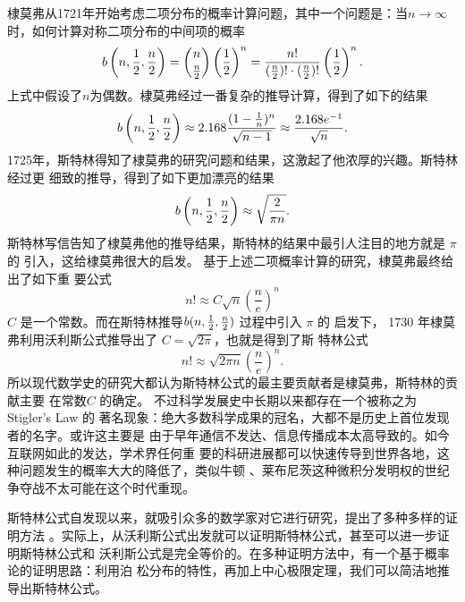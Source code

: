 棣莫弗从1721年开始考虑二项分布的概率计算问题，其中一个问题是：当$n \rightarrow
\infty $时，如何计算对称二项分布的中间项的概率
$$ b\left(n, {1\over2}, {n \over 2}\right) = \binom{n}{{n \over 2}} 
\left(\frac{1}{2}\right)^n 
= \frac{n!}{({n\over 2})! \cdot ({n \over 2})!} \left(\frac{1}{2}\right)^n .$$
上式中假设了$n$为偶数。棣莫弗经过一番复杂的推导计算，得到了如下的结果
$$ b\left(n, {1\over2}, {n\over2}\right) \approx  2.168 \frac{(1 - {1\over n})^n} {\sqrt{n-1}} 
\approx \frac{2.168 e^{-1}}{\sqrt{n}}.$$
1725年，斯特林得知了棣莫弗的研究问题和结果，这激起了他浓厚的兴趣。斯特林经过更
细致的推导，得到了如下更加漂亮的结果
$$ b\left(n, {1\over2}, {n\over2}\right) \approx \sqrt{\frac{2}{\pi n}} .$$
斯特林写信告知了棣莫弗他的推导结果，斯特林的结果中最引人注目的地方就是 $\pi$ 的
引入，这给棣莫弗很大的启发。 基于上述二项概率计算的研究，棣莫弗最终给出了如下重
要公式
$$ n! \approx C \sqrt{n} \left(\frac{n}{e}\right)^{n} $$
$C$ 是一个常数。而在斯特林推导$b(n, {1\over2}, {n\over2})$ 过程中引入 $\pi$ 的
启发下， 1730 年棣莫弗利用沃利斯公式推导出了 $C = \sqrt{2\pi}$，也就是得到了斯
特林公式
$$ n! \approx \sqrt{2\pi n} \left(\frac{n}{e}\right)^{n} .$$
所以现代数学史的研究大都认为斯特林公式的最主要贡献者是棣莫弗，斯特林的贡献主要
在常数$C$ 的确定。 不过科学发展史中长期以来都存在一个被称之为 Stigler's Law 的
著名现象：绝大多数科学成果的冠名，大都不是历史上首位发现者的名字。或许这主要是
由于早年通信不发达、信息传播成本太高导致的。如今互联网如此的发达，学术界任何重
要的科研进展都可以快速传导到世界各地，这种问题发生的概率大大的降低了，类似牛顿
、莱布尼茨这种微积分发明权的世纪争夺战不太可能在这个时代重现。 

斯特林公式自发现以来，就吸引众多的数学家对它进行研究，提出了多种多样的证明方法
。实际上，从沃利斯公式出发就可以证明斯特林公式，甚至可以进一步证明斯特林公式和
沃利斯公式是完全等价的。在多种证明方法中，有一个基于概率论的证明思路：利用泊
松分布的特性，再加上中心极限定理，我们可以简洁地推导出斯特林公式。

